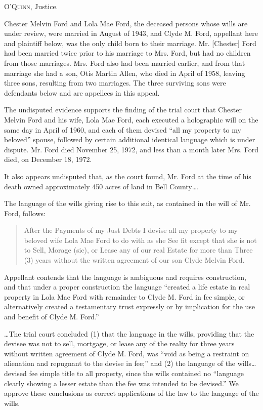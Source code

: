 

\textsc{O'Quinn}, Justice.

Chester Melvin Ford and Lola Mae Ford, the deceased persons whose wills are
under review, were married in August of 1943, and Clyde M. Ford, appellant here
and plaintiff below, was the only child born to their marriage. Mr. [Chester]
Ford had been married twice prior to his marriage to Mrs. Ford, but had no
children from those marriages. Mrs. Ford also had been married earlier, and
from that marriage she had a son, Otis Martin Allen, who died in April of 1958,
leaving three sons, resulting from two marriages. The three surviving sons were
defendants below and are appellees in this appeal.

The undisputed evidence supports the finding of the trial court that Chester
Melvin Ford and his wife, Lola Mae Ford, each executed a holographic will on
the same day in April of 1960, and each of them devised ``all my property to my
beloved'' spouse, followed by certain additional identical language which is
under dispute. Mr. Ford died November 25, 1972, and less than a month later
Mrs. Ford died, on December 18, 1972.

It also appears undisputed that, as the court found, Mr. Ford at the time of his
death owned approximately 450 acres of land in Bell County\dots.

The language of the wills giving rise to this suit, as contained in the will of
Mr. Ford, follows:
\begin{quote}
After the Payments of my Just Debts I devise all my property to my beloved
wife Lola Mae Ford to do with as she See fit except that she is not to Sell,
Morage (sic), or Lease any of our real Estate for more than Three (3) years
without the written agreement of our son Clyde Melvin Ford.
\end{quote}
Appellant contends that the language is ambiguous and requires construction, and
that under a proper construction the language ``created a life estate in real
property in Lola Mae Ford with remainder to Clyde M. Ford in fee simple, or
alternatively created a testamentary trust expressly or by implication for the
use and benefit of Clyde M. Ford.''

\dots The trial court concluded (1) that the language in the wills, providing
that the devisee was not to sell, mortgage, or lease any of the realty for
three years without written agreement of Clyde M. Ford, was ``void as being a
restraint on alienation and repugnant to the devise in fee;'' and (2) the
language of the wills\dots devised fee simple title to all property, since
the wills contained no ``language clearly showing a lesser estate than the fee
was intended to be devised.'' We approve these conclusions as correct
applications of the law to the language of the wills.

